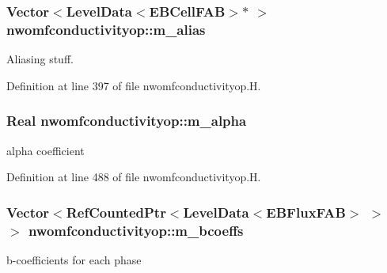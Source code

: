 \subsubsection[{\texorpdfstring{m\+\_\+alias}{m_alias}}]{\setlength{\rightskip}{0pt plus 5cm}Vector$<$Level\+Data$<$E\+B\+Cell\+F\+AB$>$$\ast$ $>$ nwomfconductivityop\+::m\+\_\+alias\hspace{0.3cm}{\ttfamily [protected]}}\hypertarget{classnwomfconductivityop_a9560594cff54a70feef15260535ed83f}{}\label{classnwomfconductivityop_a9560594cff54a70feef15260535ed83f}


Aliasing stuff. 



Definition at line 397 of file nwomfconductivityop.\+H.

\subsubsection[{\texorpdfstring{m\+\_\+alpha}{m_alpha}}]{\setlength{\rightskip}{0pt plus 5cm}Real nwomfconductivityop\+::m\+\_\+alpha\hspace{0.3cm}{\ttfamily [protected]}}\hypertarget{classnwomfconductivityop_ad40e16f1014bc48ea34cd421cc6d924a}{}\label{classnwomfconductivityop_ad40e16f1014bc48ea34cd421cc6d924a}


alpha coefficient 



Definition at line 488 of file nwomfconductivityop.\+H.

\subsubsection[{\texorpdfstring{m\+\_\+bcoeffs}{m_bcoeffs}}]{\setlength{\rightskip}{0pt plus 5cm}Vector$<$Ref\+Counted\+Ptr$<$Level\+Data$<$E\+B\+Flux\+F\+AB$>$ $>$ $>$ nwomfconductivityop\+::m\+\_\+bcoeffs\hspace{0.3cm}{\ttfamily [protected]}}\hypertarget{classnwomfconductivityop_a3db3b15e614b2ab9e8d1ddfa6b1bde93}{}\label{classnwomfconductivityop_a3db3b15e614b2ab9e8d1ddfa6b1bde93}


b-\/coefficients for each phase 



